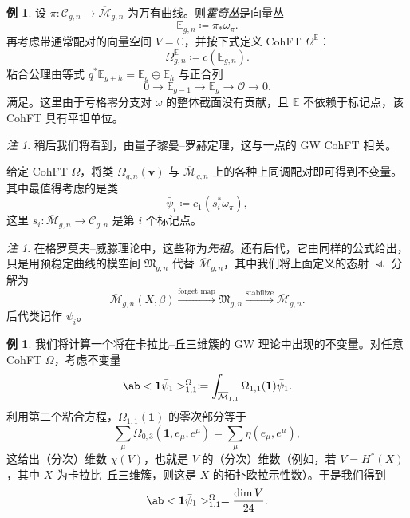 \documentclass{amsart}
\theoremstyle{definition}
\newtheorem{exm}[thm]{例}
\theoremstyle{remark}
\newtheorem{rmk}[thm]{注}
\theoremstyle{plain}
\theoremstyle{definition}
\theoremstyle{remark}
\newcommand{\C}{\mathbb{C}}
\newcommand{\E}{\mathbb{E}}
\newcommand{\Mbar}{\overline{\mathcal{M}}}
\newcommand{\mc}[1]{\mathcal{#1}}
\newcommand{\mf}[1]{\mathfrak{#1}}
\newcommand{\mbf}[1]{\mathbf{#1}}
\newcommand{\bv}{\mbf{v}}
\newcommand{\1}{\mathbf{1}}
\newcommand{\2}{\mathbf{2}}
\newcommand{\3}{\mathbf{3}}
\DeclareMathOperator{\st}{st}
\begin{document}
\begin{exm}
    设 $\pi \colon \mc{C}_{g,n} \to \Mbar_{g,n}$ 为万有曲线。则\textit{霍奇丛}是向量丛
    \[ \E_{g,n} \coloneqq \pi_* \omega_{\pi}. \]
    再考虑带通常配对的向量空间 $V = \C$，并按下式定义 CohFT $\Omega^{\E}$：
    \[ \Omega^{\E}_{g,n} \coloneqq c(\E_{g,n}). \]
    粘合公理由等式 $q^* \E_{g+h} = \E_g \oplus \E_h$ 与正合列
    \[ 0 \to \E_{g-1} \to \E_g \to \mc{O} \to 0. \]
    满足。这里由于亏格零分支对 $\omega$ 的整体截面没有贡献，且 $\E$ 不依赖于标记点，该 CohFT 具有平坦单位。
\end{exm}

\begin{rmk}
    稍后我们将看到，由量子黎曼–罗赫定理，这与一点的 GW CohFT 相关。
\end{rmk}

给定 CohFT $\Omega$，将类 $\Omega_{g,n}(\bv)$ 与 $\Mbar_{g,n}$ 上的各种上同调配对即可得到不变量。其中最值得考虑的是类
\[ \bar{\psi}_i \coloneqq c_1( s_i^* \omega_{\pi} ), \]
这里 $s_i \colon \Mbar_{g,n} \to \mc{C}_{g,n}$ 是第 $i$ 个标记点。

\begin{rmk}
    在格罗莫夫–威滕理论中，这些称为\textit{先祖}。还有后代，它由同样的公式给出，只是用预稳定曲线的模空间 $\mf{M}_{g,n}$ 代替 $\Mbar_{g,n}$，其中我们将上面定义的态射 $\st$ 分解为
    \[ \Mbar_{g,n}(X,\beta) \xrightarrow{\text{forget map}} \mf{M}_{g,n} \xrightarrow{\text{stabilize}} \Mbar_{g,n}. \]
    后代类记作 $\psi_i$。
\end{rmk}

\begin{exm}
    我们将计算一个将在卡拉比–丘三维簇的 GW 理论中出现的不变量。对任意 CohFT $\Omega$，考虑不变量
    \[ \ab<\1\bar{\psi}_1>_{1,1}^{\Omega}\coloneqq \int_{\Mbar_{1,1}} \Omega_{1,1}(\1)\bar{\psi}_1. \]
    利用第二个粘合方程，$\Omega_{1,1}(\1)$ 的零次部分等于
    \[ \sum_{\mu} \Omega_{0,3}(\1, e_{\mu}, e^{\mu}) = \sum_{\mu} \eta(e_{\mu}, e^{\mu}), \]
    这给出（分次）维数 $\chi(V)$，也就是 $V$ 的（分次）维数（例如，若 \(V = H^*(X)\)，其中 \(X\) 为卡拉比–丘三维簇，则这是 \(X\) 的拓扑欧拉示性数）。于是我们得到
    \[ \ab<\1\bar{\psi}_1>_{1,1}^{\Omega} = \frac{\dim V}{24}. \]
\end{exm}
\end{document}
